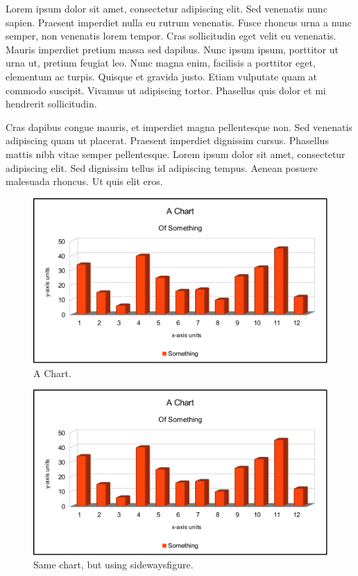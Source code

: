 \documentclass[double,12pt]{beavtex}
\begin{document}
Lorem ipsum dolor sit amet, consectetur adipiscing elit. Sed venenatis nunc sapien. Praesent imperdiet nulla eu rutrum venenatis. Fusce rhoncus urna a nunc semper, non venenatis lorem tempor. Cras sollicitudin eget velit eu venenatis. Mauris imperdiet pretium massa sed dapibus. Nunc ipsum ipsum, porttitor ut urna ut, pretium feugiat leo. Nunc magna enim, facilisis a porttitor eget, elementum ac turpis. Quisque et gravida justo. Etiam vulputate quam at commodo suscipit. Vivamus ut adipiscing tortor. Phasellus quis dolor et mi hendrerit sollicitudin. 

Cras dapibus congue mauris, et imperdiet magna pellentesque non. Sed venenatis adipiscing quam ut placerat. Praesent imperdiet dignissim cursus. Phasellus mattis nibh vitae semper pellentesque. Lorem ipsum dolor sit amet, consectetur adipiscing elit. Sed dignissim tellus id adipiscing tempus. Aenean posuere malesuada rhoncus. Ut quis elit eros.


\pagebreak[4]

\begin{figure}
\begin{center}
	\includegraphics[width=14cm]{chart.pdf}
	\caption{A Chart.}
	\label{fig:chart}
	\end{center}
\end{figure}

\pagebreak[4]

\begin{figure}
\begin{center}
	\includegraphics[width=18cm]{chart.pdf}
	\caption{Same chart, but using sidewaysfigure.}
	\label{fig:rain}
	\end{center}
\end{figure}
\end{document}
